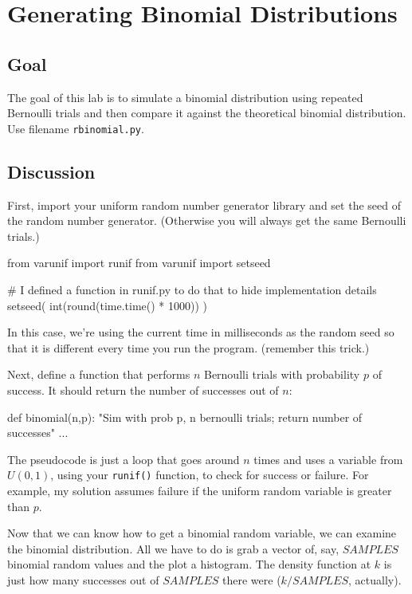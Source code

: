 \chapter{Generating Binomial Distributions}

\setcounter{problem}{1}
\section{Goal}

\begin{fullwidth}

The goal of this lab is to simulate a binomial distribution using repeated Bernoulli trials and then compare it against the theoretical binomial distribution. Use filename {\tt rbinomial.py}.

\section{Discussion}

\step First, import your uniform random number generator library and set the seed of the random number generator.
(Otherwise you will always get the same Bernoulli trials.) 

\begin{pyverbatim}
from varunif import runif
from varunif import setseed

# I defined a function in runif.py to do that to hide implementation details
setseed( int(round(time.time() * 1000)) )
\end{pyverbatim}

In this case, we're using the current time in milliseconds as the random seed so that it is different every time you run the program. (remember this trick.)

\step Next, define a function that performs $n$ Bernoulli trials with probability $p$ of success. It should return the number of successes out of $n$:

\begin{pyverbatim}
def binomial(n,p):
    "Sim with prob p, n bernoulli trials; return number of successes"
    ...
\end{pyverbatim}

The pseudocode is just a loop that goes around $n$ times and uses a variable from $U(0,1)$, using your {\tt runif()} function, to check for success or failure. For example, my solution assumes failure if the uniform random variable is greater than $p$.
    
\step Now that we can know how to get a binomial random variable, we can examine the binomial distribution.  All we have to do is grab a vector of, say, $SAMPLES$ binomial random values and the plot a histogram.  The density function at $k$ is just how many successes out of $SAMPLES$ there were ($k/SAMPLES$, actually).


\end{fullwidth}
